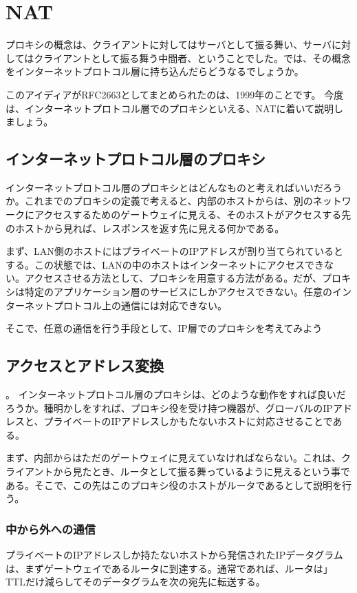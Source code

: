 \chapter{NAT}
プロキシの概念は、クライアントに対してはサーバとして振る舞い、サーバに対してはクライアントとして振る舞う中間者、ということでした。では、その概念をインターネットプロトコル層に持ち込んだらどうなるでしょうか。

このアイディアがRFC2663としてまとめられたのは、1999年のことです。
今度は、インターネットプロトコル層でのプロキシといえる、NATに着いて説明しましょう。

\section{インターネットプロトコル層のプロキシ}
インターネットプロトコル層のプロキシとはどんなものと考えればいいだろうか。これまでのプロキシの定義で考えると、内部のホストからは、別のネットワークにアクセスするためのゲートウェイに見える、そのホストがアクセスする先のホストから見れば、レスポンスを返す先に見える何かである。

まず、LAN側のホストにはプライベートのIPアドレスが割り当てられているとする。この状態では、LANの中のホストはインターネットにアクセスできない。アクセスさせる方法として、プロキシを用意する方法がある。だが、プロキシは特定のアプリケーション層のサービスにしかアクセスできない。任意のインターネットプロトコル上の通信には対応できない。

そこで、任意の通信を行う手段として、IP層でのプロキシを考えてみよう

\section{アクセスとアドレス変換}。
インターネットプロトコル層のプロキシは、どのような動作をすれば良いだろうか。種明かしをすれば、プロキシ役を受け持つ機器が、グローバルのIPアドレスと、プライベートのIPアドレスしかもたないホストに対応させることである。

まず、内部からはただのゲートウェイに見えていなければならない。これは、クライアントから見たとき、ルータとして振る舞っているように見えるという事である。そこで、この先はこのプロキシ役のホストがルータであるとして説明を行う。

\subsection{中から外への通信}

プライベートのIPアドレスしか持たないホストから発信されたIPデータグラムは、まずゲートウェイであるルータに到達する。通常であれば、ルータは」TTLだけ減らしてそのデータグラムを次の宛先に転送する。

